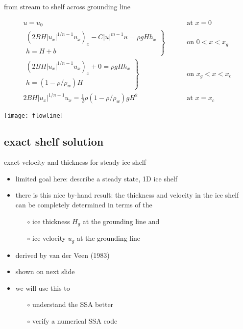 \begin{frame}{from stream to shelf across grounding line}

\begin{align*}
  u = u_0 & \qquad \text{ at } x = 0 \\
  \left.\begin{array}{r}
  \left(2 B H |u_x|^{1/n - 1} u_x\right)_x - C|u|^{m-1}u = \rho g H h_x \\
  h = H + b
  \end{array}\right\}& \qquad \text{ on } 0 < x < x_g \\
  \left.\begin{array}{r}
  \left(2 B H |u_x|^{1/n - 1} u_x\right)_x + 0 = \rho g H h_x \\
  h = (1-\rho/\rho_w) H
  \end{array}\right\}& \qquad \text{ on } x_g < x < x_c \\
  2 B H |u_x|^{1/n - 1} u_x = \frac{1}{2}\rho (1-\rho/\rho_w) g H^2 & \qquad \text{ at } x = x_c
\end{align*}

\bigskip
\begin{center}
  \texttt{[image: flowline]}
\end{center}
\end{frame}


\subsection{exact shelf solution}

\begin{frame}{exact velocity and thickness for steady ice shelf}

\begin{itemize}
\item limited goal here: describe a steady state, 1D ice shelf
\item there is this nice \alert{by-hand} result: the thickness and velocity in the ice shelf can be completely determined in terms of the 
  \begin{itemize}
  \item[$\circ$] ice thickness $H_g$ at the grounding line and
  \item[$\circ$] ice velocity $u_g$ at the grounding line
  \end{itemize}
\item derived by van der Veen (1983)
\item shown on next slide
\item we will use this to
  \begin{itemize}
  \item[$\circ$] understand the SSA better
  \item[$\circ$] verify a numerical SSA code
  \end{itemize}
\end{itemize}
\end{frame}


